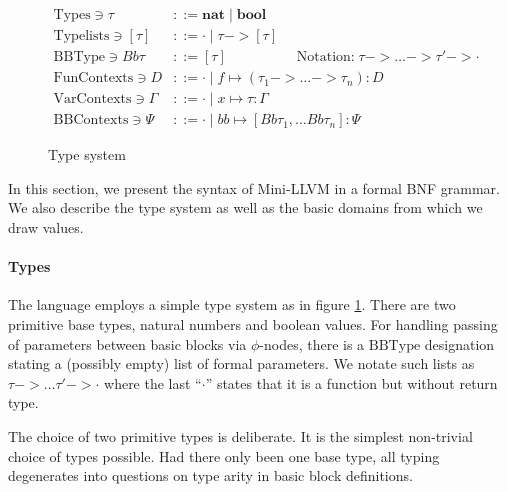 \documentclass[a4paper, oneside, 10pt, draft]{memoir}
\begin{document}
\newcommand{\variables}{\mathrm{Variables}}
\newcommand{\BBlabels}{\mathrm{BB Labels}}
\newcommand{\tnat}{\mathbf{nat}}
\newcommand{\tbool}{\mathbf{bool}}
\newcommand{\types}{\mathrm{Types}}
\newcommand{\typelist}{\mathrm{Type lists}}
\newcommand{\bbtype}{\mathrm{BB Type}}
\newcommand{\ftype}{\mathrm{Fun Contexts}}
\newcommand{\tpenv}{\mathrm{Var Contexts}}
\newcommand{\bbenv}{\mathrm{BB Contexts}}
\newcommand{\bor}{\; \vert \;}

\begin{figure}
  \begin{align*}
    \types \ni \tau & ::= \tnat \bor \tbool \\
    \typelist \ni [\tau] & ::= \cdot \bor \tau -> [\tau] \\
    \bbtype \ni Bb \tau   & ::= [\tau] \quad \quad \quad \quad \quad \text{Notation:} \; \tau -> \dotsc -> \tau' -> \cdot\\
    \ftype \ni D & ::= \cdot \bor f \mapsto (\tau_1 -> \dotsc ->
    \tau_n) : D \\
    \tpenv \ni \Gamma & ::= \cdot \bor x \mapsto \tau : \Gamma\\
    \bbenv \ni \Psi   & ::= \cdot \bor bb \mapsto [Bb \tau_1, \dotsc Bb
    \tau_n] : \Psi
  \end{align*}
  \caption{Type system}
  \label{fig:type-system}
\end{figure}

In this section, we present the syntax of Mini-LLVM in a formal BNF
grammar. We also describe the type system as well as the basic domains
from which we draw values.

\paragraph{Types} The language employs a simple type system as in
figure \ref{fig:type-system}. There are two primitive base types,
natural numbers and boolean values. For handling passing of parameters
between basic blocks via $\phi$-nodes, there is a $\bbtype$
designation stating a (possibly empty) list of formal parameters. We
notate such lists as $\tau -> \dotsc \tau' -> \cdot$ where the last
``$\cdot$'' states that it is a function but without return type.

The choice of two primitive types is deliberate. It is the simplest
non-trivial choice of types possible. Had there only been one base
type, all typing degenerates into questions on type arity in basic
block definitions.

\newcommand{\numbers}{\mathrm{Numbers}}
\newcommand{\booleans}{\mathrm{Booleans}}
\newcommand{\nat}{n}
\newcommand{\bool}{b}
\newcommand{\BB}{\mathbb{B}}
\newcommand{\btrue}{\mathbf{True}}
\newcommand{\bfalse}{\mathbf{False}}
\end{document}
